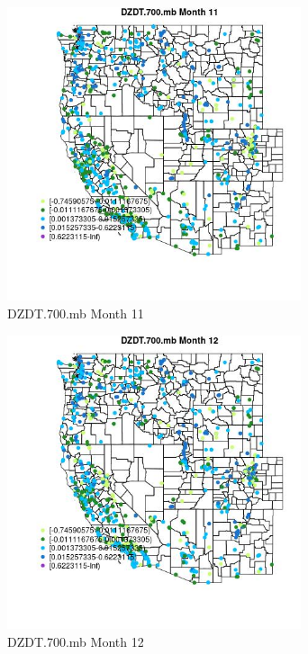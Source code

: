 \begin{figure} 
\centering  
\includegraphics[width=0.77\textwidth]{Code_Outputs/Report_ML_input_PM25_Step4_part_f_de_duplicated_aves_prioritize_24hr_obswNAs_MapObsMo11DZDT700mb.jpg} 
\caption{\label{fig:Report_ML_input_PM25_Step4_part_f_de_duplicated_aves_prioritize_24hr_obswNAsMapObsMo11DZDT700mb}DZDT.700.mb Month 11} 
\end{figure} 
 

\begin{figure} 
\centering  
\includegraphics[width=0.77\textwidth]{Code_Outputs/Report_ML_input_PM25_Step4_part_f_de_duplicated_aves_prioritize_24hr_obswNAs_MapObsMo12DZDT700mb.jpg} 
\caption{\label{fig:Report_ML_input_PM25_Step4_part_f_de_duplicated_aves_prioritize_24hr_obswNAsMapObsMo12DZDT700mb}DZDT.700.mb Month 12} 
\end{figure} 
 

